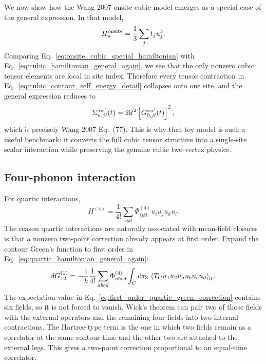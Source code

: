 We now show how the Wang 2007 onsite cubic model emerges as a special case of the general expression. In that model,
\begin{equation}
    H_n^{\rm onsite} = \frac{1}{3}\sum_j t_j u_j^3.
    \label{eq:onsite_cubic_special_hamiltonian}
\end{equation}
Comparing Eq.~\eqref{eq:onsite_cubic_special_hamiltonian} with Eq.~\eqref{eq:cubic_hamiltonian_general_again}, we see that the only nonzero cubic tensor elements are local in site index. Therefore every tensor contraction in Eq.~\eqref{eq:cubic_contour_self_energy_detail} collapses onto one site, and the general expression reduces to
\begin{equation}
    \Sigma_{n,jl}^{\sigma\sigma'}(t) = 2\mathrm{i} t^2 \left[ G_{0,jl}^{\sigma\sigma'}(t) \right]^2,
    \label{eq:wang77_recovered_again}
\end{equation}
which is precisely Wang 2007 Eq.~(77). This is why that toy model is such a useful benchmark: it converts the full cubic tensor structure into a single-site scalar interaction while preserving the genuine cubic two-vertex physics.

\subsection{Four-phonon interaction}
For quartic interactions,
\begin{equation}
    H^{(4)} = \frac{1}{4!}\sum_{ijkl}\Phi^{(4)}_{ijkl}u_i u_j u_k u_l.
    \label{eq:quartic_hamiltonian_general_again}
\end{equation}
The reason quartic interactions are naturally associated with mean-field closures is that a nonzero two-point correction already appears at first order. Expand the contour Green's function to first order in Eq.~\eqref{eq:quartic_hamiltonian_general_again}:
\begin{equation}
    \delta G^{(1)}_{12}
    =
    -\frac{\mathrm{i}}{\hbar}\frac{1}{4!}
    \sum_{abcd}\Phi^{(4)}_{abcd}
    \int_C \mathrm{d}\tau_3\,
    \left\langle T_C u_1 u_2 u_a u_b u_c u_d \right\rangle_0.
    \label{eq:first_order_quartic_green_correction}
\end{equation}
The expectation value in Eq.~\eqref{eq:first_order_quartic_green_correction} contains six fields, so it is not forced to vanish. Wick's theorem can pair two of those fields with the external operators and the remaining four fields into two internal contractions. The Hartree-type term is the one in which two fields remain as a correlator at the same contour time and the other two are attached to the external legs. This gives a two-point correction proportional to an equal-time correlator.

